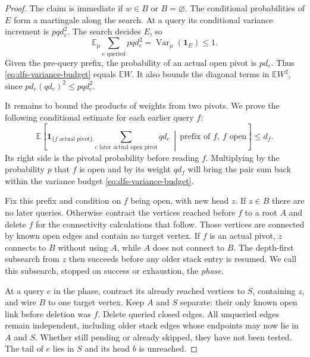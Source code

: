 \documentclass[11pt]{article}
\theoremstyle{definition}
\newcommand{\EE}{\mathbb E}
\DeclareMathOperator{\Var}{Var}
\begin{document}
\begin{proof}
The claim is immediate if $w\in B$ or $B=\varnothing$.
The conditional probabilities of $E$ form a martingale along the
search. At a query its conditional variance increment is $pq d_e^2$.
The search decides $E$, so
\begin{equation}\label{eq:dfs-variance-budget}
 \EE_\mu\sum_{e\text{ queried}}pq d_e^2
 =\Var_\mu(\mathbf1_E)\le1.
\end{equation}
Given the pre-query prefix, the probability of an actual open pivot is
$p d_e$. Thus \eqref{eq:dfs-variance-budget} equals $\EE W$.
It also bounds the diagonal terms in $\EE W^2$, since
$p d_e(qd_e)^2\le pq d_e^2$.

It remains to bound the products of weights from two pivots. We prove
the following conditional estimate for each earlier query $f$:
\begin{equation}\label{eq:dfs-future-pair-bound}
 \EE\left[
 \mathbf1_{\{f\text{ actual pivot}\}}
 \sum_{e\text{ later actual open pivot}}q d_e
 \,\middle|\,\text{prefix of }f,\ f\text{ open}\right]\le d_f.
\end{equation}
Its right side is the pivotal probability before reading $f$.
Multiplying by the probability $p$ that $f$ is open and by its weight
$qd_f$ will bring the pair sum back within the variance budget
\eqref{eq:dfs-variance-budget}.

Fix this prefix and condition on $f$ being open, with new head $z$.
If $z\in B$ there are no later queries. Otherwise contract the vertices
reached before $f$ to a root $A$ and delete $f$ for the connectivity
calculations that follow. Those vertices are connected by known open
edges and contain no target vertex. If $f$ is an actual pivot, $z$
connects to $B$ without using $A$, while $A$ does not connect to $B$.
The depth-first subsearch from $z$ then succeeds before any older stack
entry is resumed. We call this subsearch, stopped on success or
exhaustion, the \emph{phase}.

At a query $e$ in the phase, contract its already reached vertices to
$S$, containing $z$, and wire $B$ to one target vertex. Keep $A$ and
$S$ separate: their only known open link before deletion was $f$.
Delete queried closed edges. All unqueried edges remain independent,
including older stack edges whose endpoints may now lie in $A$ and
$S$. Whether still pending or already skipped, they have not been tested.
The tail of $e$ lies
in $S$ and its head $b$ is unreached.


\end{proof}
\end{document}

